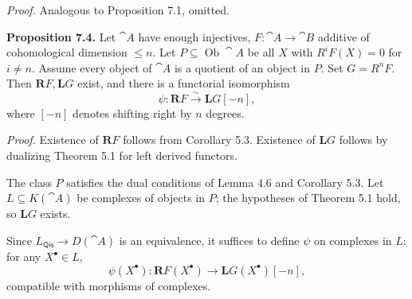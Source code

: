\textit{Proof.} Analogous to Proposition 7.1, omitted.

\setcounter{page}{75}
\textbf{Proposition 7.4.}
Let \(\cat{A}\) have enough injectives, \(F\colon\cat{A}\to\cat{B}\) additive of cohomological dimension \(\le n\).
Let \(P\subseteq\operatorname{Ob}\cat{A}\) be all \(X\) with \(R^iF(X)=0\) for \(i\ne n\).
Assume every object of \(\cat{A}\) is a quotient of an object in \(P\).
Set \(G=R^nF\). Then \(\mathbf{R}F,\mathbf{L}G\) exist, and there is a functorial isomorphism
\[
\psi\colon \mathbf{R}F \stackrel{\sim}{\to} \mathbf{L}G[-n],
\]
where \([-n]\) denotes shifting right by \(n\) degrees.

\textit{Proof.}
Existence of \(\mathbf{R}F\) follows from Corollary 5.3.
Existence of \(\mathbf{L}G\) follows by dualizing Theorem 5.1 for left derived functors.

The class \(P\) satisfies the dual conditions of Lemma 4.6 and Corollary 5.3.
Let \(L\subseteq K(\cat{A})\) be complexes of objects in \(P\);
the hypotheses of Theorem 5.1 hold, so \(\mathbf{L}G\) exists.

Since \(L_{\mathsf{Qis}}\to D(\cat{A})\) is an equivalence,
it suffices to define \(\psi\) on complexes in \(L\):
for any \(X^\bullet\in L\),
\[
\psi(X^\bullet)\colon \mathbf{R}F(X^\bullet)\to \mathbf{L}G(X^\bullet)[-n],
\]
compatible with morphisms of complexes.